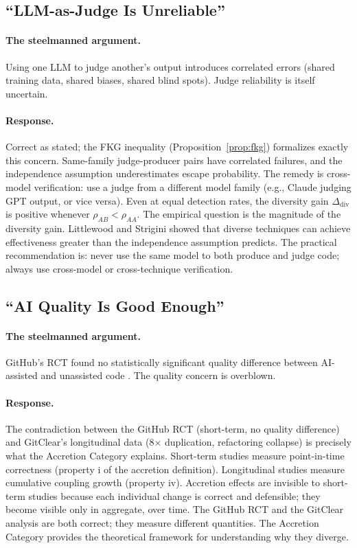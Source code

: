 \documentclass[11pt, a4paper, copyright]{googledeepmind}
\begin{document}
\subsection{``LLM-as-Judge Is Unreliable''}

\paragraph{The steelmanned argument.} Using one LLM to judge another's output introduces correlated errors (shared training data, shared biases, shared blind spots). Judge reliability is itself uncertain.

\paragraph{Response.} Correct as stated; the FKG inequality (Proposition~\ref{prop:fkg}) formalizes exactly this concern. Same-family judge-producer pairs have correlated failures, and the independence assumption underestimates escape probability. The remedy is cross-model verification: use a judge from a different model family (e.g., Claude judging GPT output, or vice versa). Even at equal detection rates, the diversity gain $\Delta_{\mathrm{div}}$ is positive whenever $\rho_{AB} < \rho_{AA}$. The empirical question is the magnitude of the diversity gain. Littlewood and Strigini \citep{littlewood1993} showed that diverse techniques can achieve effectiveness greater than the independence assumption predicts. The practical recommendation is: never use the same model to both produce and judge code; always use cross-model or cross-technique verification.

\subsection{``AI Quality Is Good Enough''}

\paragraph{The steelmanned argument.} GitHub's RCT found no statistically significant quality difference between AI-assisted and unassisted code \citep{github2024rct}. The quality concern is overblown.

\paragraph{Response.} The contradiction between the GitHub RCT (short-term, no quality difference) and GitClear's longitudinal data (8$\times$ duplication, refactoring collapse) is precisely what the Accretion Category explains. Short-term studies measure point-in-time correctness (property i of the accretion definition). Longitudinal studies measure cumulative coupling growth (property iv). Accretion effects are invisible to short-term studies because each individual change is correct and defensible; they become visible only in aggregate, over time. The GitHub RCT and the GitClear analysis are both correct; they measure different quantities. The Accretion Category provides the theoretical framework for understanding why they diverge.
\end{document}

